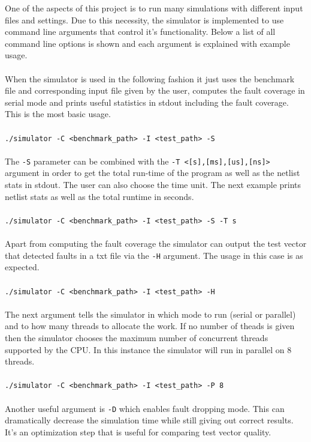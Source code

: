 \documentclass[a4paper,12pt]{article}
\begin{document}
One of the aspects of this project is to run many simulations with different input files and settings. Due to this necessity, the simulator is implemented to use command line arguments that control it's functionality. Below a list of all command line options is shown and each argument is explained with example usage.
\\\\
When the simulator is used in the following fashion it just uses the benchmark file and corresponding input file given by the user, computes the fault coverage in serial mode and prints useful statistics in stdout including the fault coverage. This is the most basic usage. 
\\\\ \texttt{./simulator -C <benchmark\_path> -I <test\_path> -S} \\\\
The \texttt{-S} parameter can be combined with the \texttt{-T <[s],[ms],[us],[ns]>} argument in order to get the total run-time of the program as well as the netlist stats in stdout. The user can also choose the time unit. The next example prints netlist stats as well as the total runtime in seconds.
\\\\ \texttt{./simulator -C <benchmark\_path> -I <test\_path> -S -T s} \\\\
Apart from computing the fault coverage the simulator can output the test vector that detected faults in a txt file via the \texttt{-H} argument. The usage in this case is as expected. 
\\\\ \texttt{./simulator -C <benchmark\_path> -I <test\_path> -H} \\\\
The next argument tells the simulator in which mode to run (serial or parallel) and to how many threads to allocate the work. If no number of theads is given then the simulator chooses the maximum number of concurrent threads supported by the CPU. In this instance the simulator will run in parallel on 8 threads.
\\\\ \texttt{./simulator -C <benchmark\_path> -I <test\_path> -P 8} \\\\
Another useful argument is \texttt{-D} which enables fault dropping mode. This can dramatically decrease the simulation time while still giving out correct results. It's an optimization step that is useful for comparing test vector quality.
\end{document}
